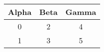 \documentclass{report}
\begin{document}
\begin{table}[htbp]
\begin{tabularx}{\textwidth}{|c|c|c|}
\hline
Alpha & Beta & Gamma \\ \hline
0     & 2    & 4     \\ \hline
1     & 3    & 5     \\ \hline
\end{tabularx}
\end{table}
\end{document}

